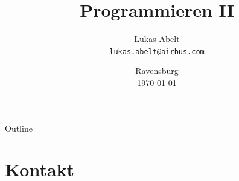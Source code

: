 \documentclass[	12pt, 				
				t,					
				aspectratio=169,
				]{beamer}
\title{Programmieren II}
\date{Ravensburg\\\today}
\author{Lukas Abelt \\\texttt{lukas.abelt@airbus.com}}
\institute{DHBW Ravensburg \\ Wirtschaftsinformatik}
\begin{document}
	
	\begin{frame}[noframenumbering]
		\titlepage
	\end{frame}


	\begin{frame}{Outline}
		\tableofcontents
	\end{frame}

	
	
	
	
	
	
	\section*{Kontakt}
	
	
\end{document}
